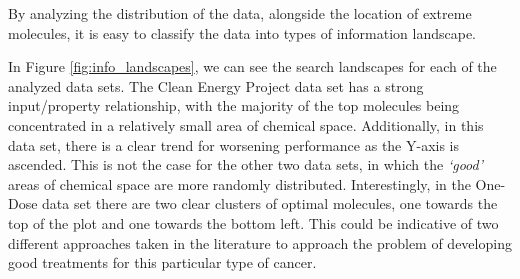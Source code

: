 By
analyzing the distribution of the data, alongside the location of extreme
molecules, it is easy to classify the data into types of information landscape.

In Figure \ref{fig:info_landscapes}, we can see the search landscapes
for each of the analyzed data sets.  The Clean
Energy Project data set has a strong input/property
relationship, with the majority of the top molecules being concentrated in a
relatively small area of chemical space. Additionally, in this data set, there
is a clear trend for worsening performance as the Y-axis is ascended.  This is
not the case for the other two data sets, in which the \emph{`good'} areas of chemical
space are more randomly distributed. Interestingly, in the One-Dose
data set there are two clear clusters of optimal molecules, one
towards the top of the plot and one towards the bottom left. This could be
indicative of two different approaches taken in the literature to approach the
problem of developing good treatments for this particular type of cancer.